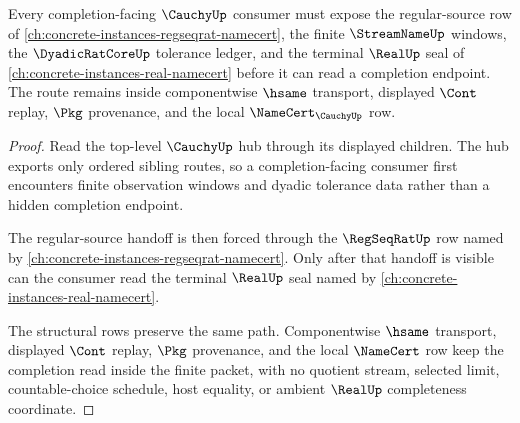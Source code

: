 \begin{theorem}
\label{thm:cauchy-regseqrat-real-dependency-route}
Every completion-facing $\CauchyUp$ consumer must expose the regular-source row of \autoref{ch:concrete-instances-regseqrat-namecert}, the finite $\StreamNameUp$ windows, the $\DyadicRatCoreUp$ tolerance ledger, and the terminal $\RealUp$ seal of \autoref{ch:concrete-instances-real-namecert} before it can read a completion endpoint. The route remains inside componentwise $\hsame$ transport, displayed $\Cont$ replay, $\Pkg$ provenance, and the local $\NameCert_{\CauchyUp}$ row.
\end{theorem}
\begin{proof}
Read the top-level $\CauchyUp$ hub through its displayed children. The hub exports only ordered sibling routes, so a completion-facing consumer first encounters finite observation windows and dyadic tolerance data rather than a hidden completion endpoint.

The regular-source handoff is then forced through the $\RegSeqRatUp$ row named by \autoref{ch:concrete-instances-regseqrat-namecert}. Only after that handoff is visible can the consumer read the terminal $\RealUp$ seal named by \autoref{ch:concrete-instances-real-namecert}.

The structural rows preserve the same path. Componentwise $\hsame$ transport, displayed $\Cont$ replay, $\Pkg$ provenance, and the local $\NameCert$ row keep the completion read inside the finite packet, with no quotient stream, selected limit, countable-choice schedule, host equality, or ambient $\RealUp$ completeness coordinate.
\end{proof}
